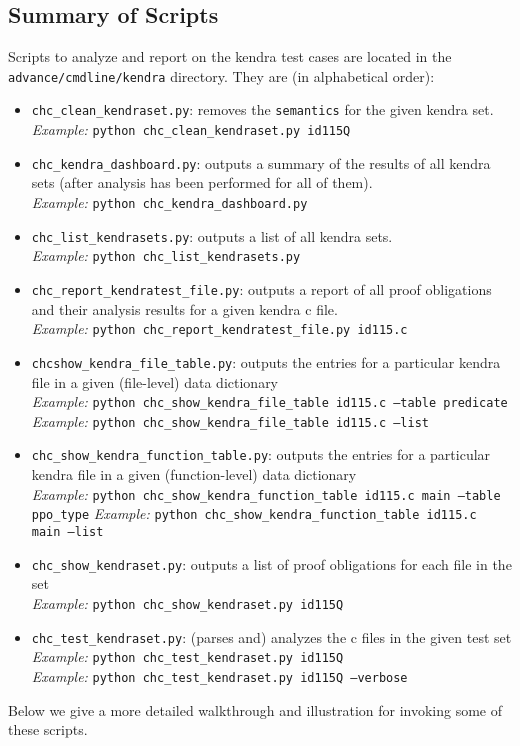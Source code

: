 \documentclass[11pt]{article}
\begin{document}
\subsection{Summary of Scripts}
Scripts to analyze and report on the kendra test cases are located in the 
{\tt advance/cmdline/kendra} directory. They are (in alphabetical
order):
\begin{itemize}
\item {\tt chc\_clean\_kendraset.py}: removes the {\tt semantics} for the given
  kendra set. \\
  \emph{Example:} {\tt python chc\_clean\_kendraset.py id115Q}
\item {\tt chc\_kendra\_dashboard.py}: outputs a summary of the results of all
  kendra sets (after analysis has been performed for all of them). \\
  \emph{Example:} {\tt python chc\_kendra\_dashboard.py}
\item {\tt chc\_list\_kendrasets.py}: outputs a list of all kendra sets.\\
  \emph{Example:} {\tt python chc\_list\_kendrasets.py}
\item {\tt chc\_report\_kendratest\_file.py}: outputs a report of all proof obligations
   and their analysis results for a given kendra c file. \\
   \emph{Example:} {\tt python chc\_report\_kendratest\_file.py id115.c}
\item {\tt chc\-show\_kendra\_file\_table.py}: outputs the entries for a particular
   kendra file in a given (file-level) data dictionary \\
   \emph{Example:} {\tt python chc\_show\_kendra\_file\_table id115.c --table predicate} \\
   \emph{Example:} {\tt python chc\_show\_kendra\_file\_table id115.c --list}
\item {\tt chc\_show\_kendra\_function\_table.py}: outputs the entries for a particular
   kendra file in a given (function-level) data dictionary \\
   \emph{Example:} {\tt python chc\_show\_kendra\_function\_table id115.c main --table 
     ppo\_type}
   \emph{Example:} {\tt python chc\_show\_kendra\_function\_table id115.c main --list}
\item {\tt chc\_show\_kendraset.py}: outputs a list of proof obligations for each file
    in the set \\
    \emph{Example:} {\tt python chc\_show\_kendraset.py id115Q}
\item {\tt chc\_test\_kendraset.py}: (parses and) analyzes the c files in the given test
    set \\
    \emph{Example:} {\tt python chc\_test\_kendraset.py id115Q} \\
    \emph{Example:} {\tt python chc\_test\_kendraset.py id115Q --verbose}
\end{itemize}
Below we give a more detailed walkthrough and illustration for invoking some of these scripts.
\end{document}
